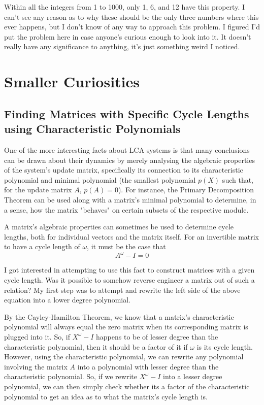 \documentclass[a4paper, 12pt, reqno]{amsart}
\newcommand{\ssection}[1]{\vspace{1cm}\section{#1}}
\newcommand{\ssubsection}[1]{\vspace{0.25cm}\subsection{#1}}
\begin{document}
			Within all the integers from 1 to 1000, only 1, 6, and 12 have this property. I can't see any reason as to why
			these should be the only three numbers where this ever happens, but I don't know of any way to approach this
			problem. I figured I'd put the problem here in case anyone's curious enough to look into it. It doesn't really
			have any significance to anything, it's just something weird I noticed.
		
	\ssection{Smaller Curiosities}
		\ssubsection{Finding Matrices with Specific Cycle Lengths using Characteristic Polynomials}
			One of the more interesting facts about LCA systems is that many conclusions can be drawn about their dynamics
			by merely analysing the algebraic properties of the system's update matrix, specifically its connection
			to its characteristic polynomial and minimal polynomial (the smallest polynomial $p(X)$ such that, for the update
			matrix $A$, $p(A) = 0$). For instance, the Primary Decomposition Theorem can be used along with a matrix's minimal 
			polynomial to determine, in a sense, how the matrix "behaves" on certain subsets of the respective module.
			
			A matrix's algebraic properties can sometimes be used to determine cycle lengths, both for individual vectors and
			the matrix itself. For an invertible matrix to have a cycle length of $\omega$, it must be the case that
			\[
				A^{\omega} - I = 0
			\]
			
			I got interested in attempting to use this fact to construct matrices with a given cycle length. Was it possible
			to somehow reverse engineer a matrix out of such a relation? My first step was to attempt and rewrite the left
			side of the above equation into a lower degree polynomial.
			
			By the Cayley-Hamilton Theorem, we know that a matrix's characteristic polynomial will always equal the zero
			matrix when its corresponding matrix is plugged into it. So, if $X^{\omega} - I$ happens to be of lesser degree
			than the characteristic polynomial, then it should be a factor of it if $\omega$ is its cycle length. However, 
			using the characteristic polynomial, we can rewrite any polynomial involving the matrix $A$ into a polynomial 
			with lesser degree than the characteristic polynomial. So, if we rewrite $X^{\omega} - I$ into a lesser degree 
			polynomial, we can then simply check whether its a factor of the characteristic polynomial to get an idea as to 
			what the matrix's cycle length is.
			
\end{document}

